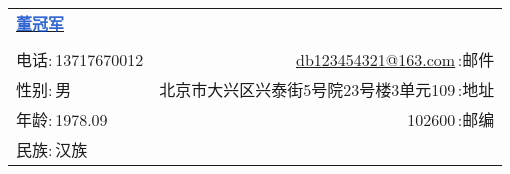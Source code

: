 \newcommand{\myheader}{
    \begin{tabular*}{\textwidth}{l@{\extracolsep{\fill}}r}
        \textbf{\href{https://herechen.github.io}{\LARGE \textcolor{highlight}{董冠军}}} \\
        \\
        {\color{blue}电话:}$\,$13717670012 & \href{mailto:db123454321@163.com}{db123454321@163.com}$\,${\color{blue}:邮件} \\
        {\color{blue}性别:}$\,$男 & 北京市大兴区兴泰街5号院23号楼3单元109$\,${\color{blue}:地址} \\
        {\color{blue}年龄:}$\,$1978.09 & 102600$\,${\color{blue}:邮编} \\
        {\color{blue}民族:}$\,$汉族  \\
    \end{tabular*}\\\vspace{0.1in}}

\myheader
